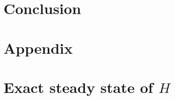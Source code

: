 \documentclass[10pt]{article}
\numberwithin{equation}{section}
\numberwithin{equation}{subsection}
\newcommand{\oa}{\mathbf{a}}
\newcommand{\oad}{\mathbf{a}^{\dagger}}
\begin{document}
\section{Conclusion}








\appendix
\section*{Appendix}

\section{Exact steady state of $H$}\label{appB}
\end{document}
